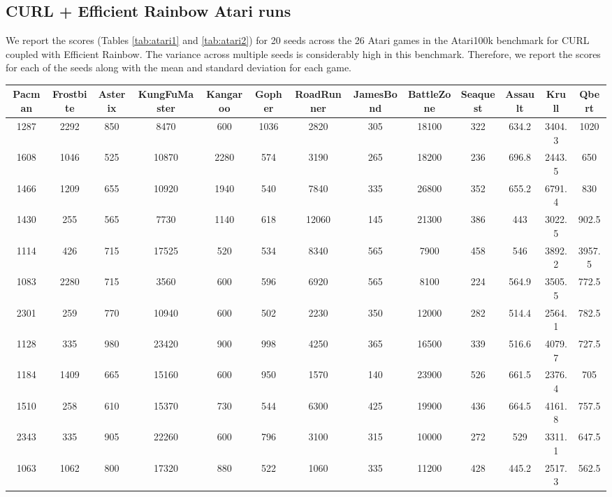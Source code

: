 \documentclass{article}
\begin{document}
\subsection{CURL + Efficient Rainbow Atari runs}

We report the scores (Tables \ref{tab:atari1} and \ref{tab:atari2}) for 20 seeds across the 26 Atari games in the Atari100k benchmark for CURL coupled with Efficient Rainbow. The variance across multiple seeds is considerably high in this benchmark. Therefore, we report the scores for each of the seeds along with the mean and standard deviation for each game. 

\begin{table*}[!ht]\centering
\small
\setlength\tabcolsep{2.5pt}
\begin{tabular}{c|c|c|c|c|c|c|c|c|c|c|c|c}
\hline
Pacman &	Frostbite &	Asterix  &	KungFuMaster &	Kangaroo &	Gopher &	RoadRunner &	JamesBond &	BattleZone &	Seaquest &	Assault &	Krull &	Qbert			 \\
\hline
1287 &	2292 &	850 &	8470 &	600 &	1036 &	2820 &	305 &	18100 &	322 &	634.2 &	3404.3 &	1020 \\
1608 &	1046 &	525 &	10870 &	2280 &	574 &	3190 &	265 &	18200 &	236 &	696.8 &	2443.5 &	650  \\
1466 &	1209 &	655 &	10920 &	1940 &	540 &	7840 &	335 &	26800 &	352 &	655.2 &	6791.4 &	830  \\
1430 &	255 &	565 &	7730 &	1140 &	618 &	12060 &	145 &	21300 &	386 &	443 &	3022.5 &	902.5  \\
1114 &	426 &	715 &	17525 &	520 &	534 &	8340 &	565 &	7900 &	458 &	546 &	3892.2 &	3957.5  \\
1083 &	2280 &	715 &	3560 &	600 &	596 &	6920 &	565 &	8100 &	224 &	564.9 &	3505.5 &	772.5 \\
2301 &	259 &	770 &	10940 &	600 &	502 &	2230 &	350 &	12000 &	282 &	514.4 &	2564.1 &	782.5  \\
1128 &	335 &	980 &	23420 &	900 &	998 &	4250 &	365 &	16500 &	339 &	516.6 &	4079.7 &	727.5  \\
1184 &	1409 &	665 &	15160 &	600 &	950 &	1570 &	140 &	23900 &	526 &	661.5 &	2376.4 &	705 \\
1510 &	258 &	610 &	15370 &	730 &	544 &	6300 &	425 &	19900 &	436 &	664.5 &	4161.8 &	757.5  \\
2343 &	335 &	905 &	22260 &	600 &	796 &	3100 &	315 &	10000 &	272 &	529 &	3311.1 &	647.5  \\
1063 &	1062 &	800 &	17320 &	880 &	522 &	1060 &	335 &	11200 &	428 &	445.2 &	2517.3 &	562.5  \\

\end{tabular}
\end{table*}
\end{document}
